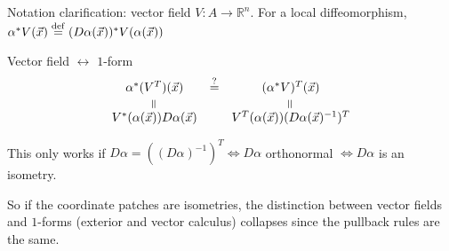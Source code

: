 \documentclass[10pt,letterpaper]{article}
\newcommand{\n}{\hfill\break}
\newcommand{\ptxt}[1]{\textrm{\textnormal{#1}}}
\newcommand{\reals}{\mathbb{R}}
\newcommand{\R}{\reals}
\newcommand{\inv}{^{-1}}
\newcommand{\tpose}{^{T}}
\newcommand{\eqdef}{\overset{\ptxt{def}}{=}}
\newcommand{\eqVertical}{\rotatebox[origin=c]{90}{=}}
\begin{document}
\par\noindent Notation clarification: vector field $V:A\to\R^{n}$.\n
For a local diffeomorphism, $\alpha^{*}V(\vec{x})\eqdef(D\alpha(\vec{x}))^{*}V(\alpha(\vec{x}))$\n

\par\noindent Vector field $\leftrightarrow$ $1$-form
\[
\begin{array}{ccc}
	\alpha^{*}(V\tpose)(\vec{x}) & \overset{?}{=} & (\alpha^{*}V)\tpose(\vec{x})\\
	\eqVertical & & \eqVertical\\
	V^{*}(\alpha(\vec{x}))D\alpha(\vec{x}) & & V\tpose(\alpha(\vec{x}))(D\alpha(\vec{x})\inv)\tpose
\end{array}
\]

\par\noindent This only works if $D\alpha=((D\alpha)\inv)\tpose\Leftrightarrow{}D\alpha$ orthonormal $\Leftrightarrow{}D\alpha$ is an isometry.\n

\par\noindent So if the coordinate patches are isometries, the distinction between vector fields and $1$-forms (exterior and vector calculus) collapses since the pullback rules are the same.
\end{document}
